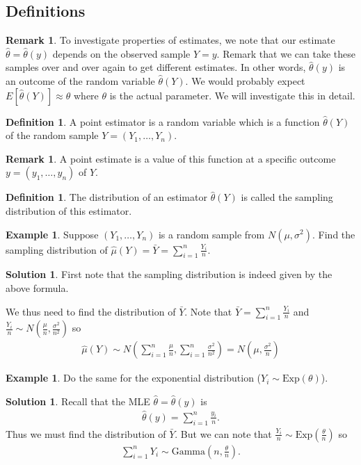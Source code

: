 \documentclass[11pt]{amsart}
\theoremstyle{definition}
\newtheorem{definition}[theorem]{Definition}
\newtheorem{remark}[theorem]{Remark}
\newtheorem{example}[theorem]{Example}
\newtheorem{solution}[theorem]{Solution}
\numberwithin{equation}{section}
\begin{document}
\subsection{Definitions}
\begin{remark}
    To investigate properties of estimates, we note that our estimate $\hat\theta=\hat\theta(y)$ depends on the observed sample $Y=y$. Remark that we can take these samples over and over again to get different estimates. In other words, $\hat\theta(y)$ is an outcome of the random variable $\hat\theta(Y)$. We would probably expect $E[\hat\theta(Y)]\approx\theta$ where $\theta$ is the actual parameter. We will investigate this in detail.
\end{remark}
\begin{definition}
    A point estimator is a random variable which is a function $\hat\theta(Y)$ of the random sample $Y=(Y_1,\ldots,Y_n)$.
\end{definition}
\begin{remark}
    A point estimate is a value of this function at a specific outcome $y=(y_1,\ldots,y_n)$ of $Y$.
\end{remark}
\begin{definition}
    The distribution of an estimator $\hat\theta(Y)$ is called the sampling distribution of this estimator.
\end{definition}
\begin{example}
    Suppose $(Y_1,\ldots,Y_n)$ is a random sample from $N(\mu,\sigma^2)$. Find the sampling distribution of $\hat\mu(Y)=\bar Y=\sum_{i=1}^n\frac{Y_i}{n}$.
\end{example}
\addtocounter{theorem}{-1}
\begin{solution}
    First note that the sampling distribution is indeed given by the above formula.

    We thus need to find the distribution of $\bar Y$. Note that $\bar Y=\sum_{i=1}^n\frac{Y_i}{n}$ and $\frac{Y_i}{n}\sim N(\frac{\mu}{n},\frac{\sigma^2}{n^2})$ so 
    \begin{align*}
        \hat\mu(Y)\sim N(\sum_{i=1}^n\frac{\mu}{n},\sum_{i=1}^n\frac{\sigma^2}{n^2})=N(\mu,\frac{\sigma^2}{n})
    \end{align*}
\end{solution}
\begin{example}
    Do the same for the exponential distribution ($Y_i\sim\mathrm{Exp}(\theta)$).
\end{example}
\addtocounter{theorem}{-1}
\begin{solution}
    Recall that the MLE $\hat\theta=\hat\theta(y)$ is
    \begin{align*}
        \hat\theta(y)=\sum_{i=1}^n\frac{y_i}{n}.
    \end{align*}
    Thus we must find the distribution of $\bar Y$. But we can note that $\frac{Y_i}{n}\sim\mathrm{Exp}(\frac{\theta}{n})$ so
    \begin{align*}
        \sum_{i=1}^nY_i\sim\mathrm{Gamma}(n,\frac{\theta}{n}).
    \end{align*}
\end{solution}
\end{document}

